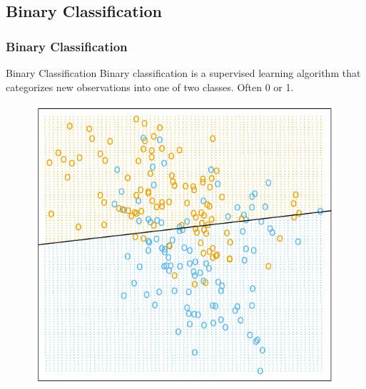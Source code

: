 \documentclass{beamer}
\begin{document}
\subsection{Binary Classification}
\begin{frame}
\frametitle{Binary Classification}
\begin{block}{Binary Classification}
Binary classification is a supervised learning algorithm that categorizes new observations into one of two classes. Often 0 or 1.
\end{block}
\begin{figure}[h]
 \centering
 \includegraphics[scale=0.25]{classificacao_hastie_ex.png}
\end{figure}
\end{frame}
\end{document}
